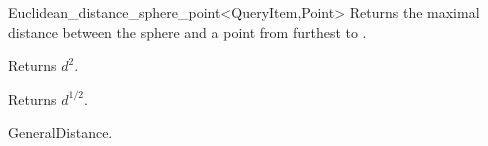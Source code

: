 \begin{ccRefClass}{Euclidean_distance_sphere_point<QueryItem,Point>}
{Returns the maximal distance between the sphere  and
a point from  furthest to .}

 {Returns $d^2$.}

 {Returns $d^{1/2}$.}


\ccSeeAlso

GeneralDistance.



\end{ccRefClass}



